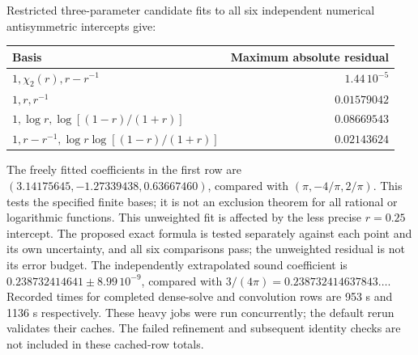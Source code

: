 \C Restricted three-parameter candidate fits to all six independent numerical antisymmetric intercepts give:
\begin{center}\small\begin{tabular}{lr}\toprule
Basis & Maximum absolute residual\\\midrule
$1,\chi_2(r),r-r^{-1}$ & $1.44\,10^{-5}$\\
$1,r,r^{-1}$ & $0.01579042$\\
$1,\log r,\log[(1-r)/(1+r)]$ & $0.08669543$\\
$1,r-r^{-1},\log r\log[(1-r)/(1+r)]$ & $0.02143624$\\
\bottomrule\end{tabular}\end{center}
\C The freely fitted coefficients in the first row are $(3.14175645, -1.27339438, 0.63667460)$, compared with $(\pi,-4/\pi,2/\pi)$. This tests the specified finite bases; it is not an exclusion theorem for all rational or logarithmic functions.
\C This unweighted fit is affected by the less precise $r=0.25$ intercept. The proposed exact formula is tested separately against each point and its own uncertainty, and all six comparisons pass; the unweighted residual is not its error budget.
\C The independently extrapolated sound coefficient is $0.238732414641\pm 8.99\,10^{-9}$, compared with $3/(4\pi)=0.238732414637843\ldots$.
\C Recorded times for completed dense-solve and convolution rows are 953 s and 1136 s respectively. These heavy jobs were run concurrently; the default rerun validates their caches. The failed refinement and subsequent identity checks are not included in these cached-row totals.
